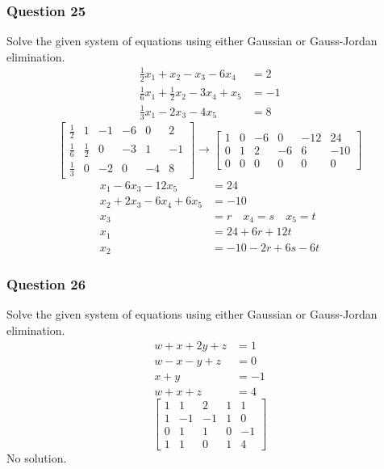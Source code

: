 \documentclass{math}
\begin{document}
\subsubsection*{Question 25}
Solve the given system of equations using either Gaussian or Gauss-Jordan
elimination.
\begin{align*}
  \frac{1}{2}x_1+x_2-x_3-6x_4 &= 2 \\
  \frac{1}{6}x_1+\frac{1}{2}x_2-3x_4+x_5 &= -1 \\
  \frac{1}{3}x_1-2x_3-4x_5 &= 8
\end{align*}
\[ \begin{bmatrix}
  \frac{1}{2} & 1 & -1 & -6 & 0 & 2 \\
  \frac{1}{6} & \frac{1}{2} & 0 & -3 & 1 & -1 \\
  \frac{1}{3} & 0 & -2 & 0 & -4 & 8
\end{bmatrix} \to \begin{bmatrix}
  1 & 0 & -6 & 0 & -12 & 24 \\
  0 & 1 & 2 & -6 & 6 & -10 \\
  0 & 0 & 0 & 0 & 0 & 0
\end{bmatrix} \]
\begin{align*}
  x_1-6x_3-12x_5 &= 24 \\
  x_2+2x_3-6x_4+6x_5 &= -10 \\
  x_3 &= r \quad x_4 = s \quad x_5 = t \\
  x_1 &= 24+6r+12t \\
  x_2 &= -10-2r+6s-6t
\end{align*}

\subsubsection*{Question 26}
Solve the given system of equations using either Gaussian or Gauss-Jordan
elimination.
\begin{align*}
  w+x+2y+z &= 1 \\
  w-x-y+z &= 0 \\
  x+y &= -1 \\
  w+x+z &= 4
\end{align*}
\[ \begin{bmatrix}
  1 & 1 & 2 & 1 & 1 \\
  1 & -1 & -1 & 1 & 0 \\
  0 & 1 & 1 & 0 & -1 \\
  1 & 1 & 0 & 1 & 4
\end{bmatrix} \]
No solution.
\end{document}
